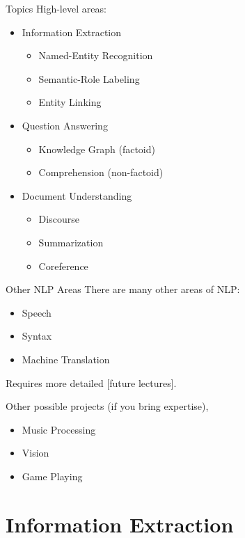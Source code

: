 \documentclass{beamer}
\begin{document}
\begin{frame}{Topics}
  High-level areas:
  \begin{itemize}
  \item Information Extraction
    \begin{itemize}
    \item Named-Entity Recognition
    \item Semantic-Role Labeling
    \item Entity Linking
    \end{itemize}
    \air 
  \item Question Answering
    \begin{itemize}
    \item Knowledge Graph (factoid)
    \item Comprehension (non-factoid)
    \end{itemize}
  \item Document Understanding
    \begin{itemize}
    \item Discourse
    \item Summarization
    \item Coreference
    \end{itemize}
  \end{itemize}

\end{frame}

\begin{frame}{Other NLP Areas}
  There are many other areas of NLP:
  \begin{itemize}
  \item Speech
  \item Syntax
  \item Machine Translation
  \end{itemize}
  \air
  Requires more detailed [future lectures].

  \air 
  Other possible projects (if you bring expertise),
  \begin{itemize}
  \item Music Processing
  \item Vision
  \item Game Playing
  \end{itemize}
\end{frame}

\section{Information Extraction}
\end{document}
